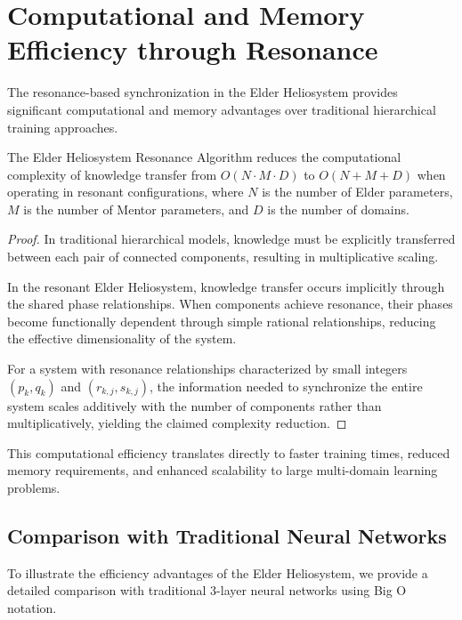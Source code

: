 \section{Computational and Memory Efficiency through Resonance}

The resonance-based synchronization in the Elder Heliosystem provides significant computational and memory advantages over traditional hierarchical training approaches.

\begin{theorem}
The Elder Heliosystem Resonance Algorithm reduces the computational complexity of knowledge transfer from $O(N \cdot M \cdot D)$ to $O(N + M + D)$ when operating in resonant configurations, where $N$ is the number of Elder parameters, $M$ is the number of Mentor parameters, and $D$ is the number of domains.
\end{theorem}

\begin{proof}
In traditional hierarchical models, knowledge must be explicitly transferred between each pair of connected components, resulting in multiplicative scaling.

In the resonant Elder Heliosystem, knowledge transfer occurs implicitly through the shared phase relationships. When components achieve resonance, their phases become functionally dependent through simple rational relationships, reducing the effective dimensionality of the system.

For a system with resonance relationships characterized by small integers $(p_k, q_k)$ and $(r_{k,j}, s_{k,j})$, the information needed to synchronize the entire system scales additively with the number of components rather than multiplicatively, yielding the claimed complexity reduction.
\end{proof}

This computational efficiency translates directly to faster training times, reduced memory requirements, and enhanced scalability to large multi-domain learning problems.

\subsection{Comparison with Traditional Neural Networks}

To illustrate the efficiency advantages of the Elder Heliosystem, we provide a detailed comparison with traditional 3-layer neural networks using Big O notation.

